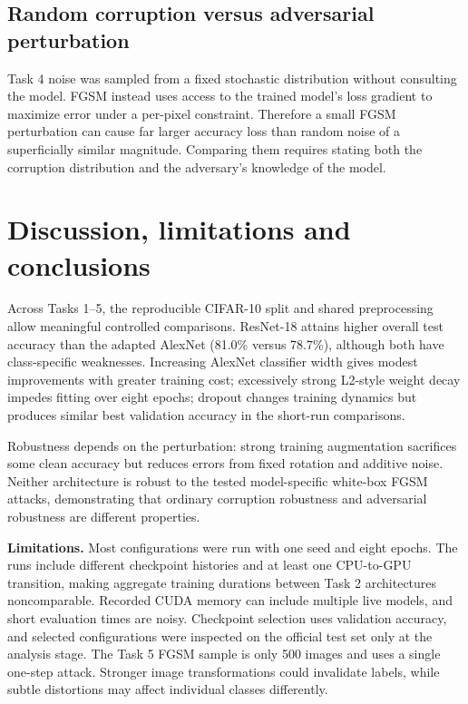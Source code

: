 \documentclass[11pt,a4paper]{article}
\begin{document}
\subsection{Random corruption versus adversarial perturbation}
Task 4 noise was sampled from a fixed stochastic distribution without consulting the model. FGSM instead uses access to the trained model's loss gradient to maximize error under a per-pixel constraint. Therefore a small FGSM perturbation can cause far larger accuracy loss than random noise of a superficially similar magnitude. Comparing them requires stating both the corruption distribution and the adversary's knowledge of the model.

\section{Discussion, limitations and conclusions}
Across Tasks 1--5, the reproducible CIFAR-10 split and shared preprocessing allow meaningful controlled comparisons. ResNet-18 attains higher overall test accuracy than the adapted AlexNet (81.0\% versus 78.7\%), although both have class-specific weaknesses. Increasing AlexNet classifier width gives modest improvements with greater training cost; excessively strong L2-style weight decay impedes fitting over eight epochs; dropout changes training dynamics but produces similar best validation accuracy in the short-run comparisons.

Robustness depends on the perturbation: strong training augmentation sacrifices some clean accuracy but reduces errors from fixed rotation and additive noise. Neither architecture is robust to the tested model-specific white-box FGSM attacks, demonstrating that ordinary corruption robustness and adversarial robustness are different properties.

\textbf{Limitations.} Most configurations were run with one seed and eight epochs. The runs include different checkpoint histories and at least one CPU-to-GPU transition, making aggregate training durations between Task 2 architectures noncomparable. Recorded CUDA memory can include multiple live models, and short evaluation times are noisy. Checkpoint selection uses validation accuracy, and selected configurations were inspected on the official test set only at the analysis stage. The Task 5 FGSM sample is only 500 images and uses a single one-step attack. Stronger image transformations could invalidate labels, while subtle distortions may affect individual classes differently.
\end{document}
